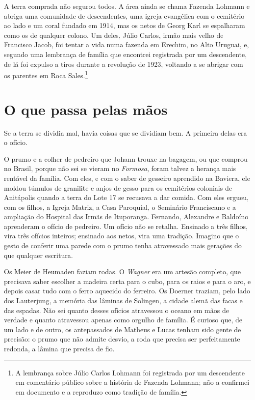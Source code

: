 \documentclass[
  brazilian,
  11pt,
  openany]{book}
\begin{document}
A terra comprada não segurou todos. A área ainda se chama Fazenda
Lohmann e abriga uma comunidade de descendentes, uma igreja evangélica
com o cemitério ao lado e um coral fundado em 1914, mas os netos de
Georg Karl se espalharam como os de qualquer colono. Um deles, Júlio
Carlos, irmão mais velho de Francisco Jacob, foi tentar a vida numa
fazenda em Erechim, no Alto Uruguai, e, segundo uma lembrança de família
que encontrei registrada por um descendente, de lá foi expulso a tiros
durante a revolução de 1923, voltando a se abrigar com os parentes em
Roca Sales.\footnote{A lembrança sobre Júlio Carlos Lohmann foi
  registrada por um descendente em comentário público sobre a história
  de Fazenda Lohmann; não a confirmei em documento e a reproduzo como
  tradição de família.}

\section{O que passa pelas mãos}\label{o-que-passa-pelas-muxe3os}

Se a terra se dividia mal, havia coisas que se dividiam bem. A primeira
delas era o ofício.

O prumo e a colher de pedreiro que Johann trouxe na bagagem, ou que
comprou no Brasil, porque não sei se vieram no \emph{Formosa}, foram
talvez a herança mais rentável da família. Com eles, e com o saber de
gesseiro aprendido na Baviera, ele moldou túmulos de granilite e anjos
de gesso para os cemitérios coloniais de Anitápolis quando a terra do
Lote 17 se recusava a dar comida. Com eles ergueu, com os filhos, a
Igreja Matriz, a Casa Paroquial, o Seminário Franciscano e a ampliação
do Hospital das Irmãs de Ituporanga. Fernando, Alexandre e Baldoíno
aprenderam o ofício de pedreiro. Um ofício não se retalha. Ensinado a
três filhos, vira três ofícios inteiros; ensinado aos netos, vira uma
tradição. Imagino que o gesto de conferir uma parede com o prumo tenha
atravessado mais gerações do que qualquer escritura.

Os Meier de Heumaden faziam rodas. O \emph{Wagner} era um artesão
completo, que precisava saber escolher a madeira certa para o cubo, para
os raios e para o aro, e depois casar tudo com o ferro aquecido do
ferreiro. Os Doerner traziam, pelo lado dos Lauterjung, a memória das
lâminas de Solingen, a cidade alemã das facas e das espadas. Não sei
quanto desses ofícios atravessou o oceano em mãos de verdade e quanto
atravessou apenas como orgulho de família. É curioso que, de um lado e
de outro, os antepassados de Matheus e Lucas tenham sido gente de
precisão: o prumo que não admite desvio, a roda que precisa ser
perfeitamente redonda, a lâmina que precisa de fio.
\end{document}
